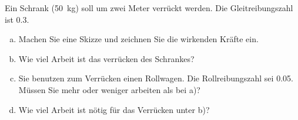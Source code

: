 
\begin{aufgabe}
	Ein Schrank (\SI{50}{kg}) soll um zwei Meter verrückt werden. Die Gleitreibungszahl ist \num{0.3}.
	\begin{enumerate} [a)]
		\item Machen Sie eine Skizze und zeichnen Sie die wirkenden Kräfte ein.
		\item	Wie viel Arbeit ist das verrücken des Schrankes?	
		\item   Sie benutzen zum Verrücken einen Rollwagen. Die Rollreibungszahl sei \num{0.05}.
			Müssen Sie mehr oder weniger arbeiten als bei a)? 
		\item Wie viel Arbeit ist nötig für das Verrücken unter b)?
	\end{enumerate}

\end{aufgabe}

\begin{loesung}

\end{loesung}
